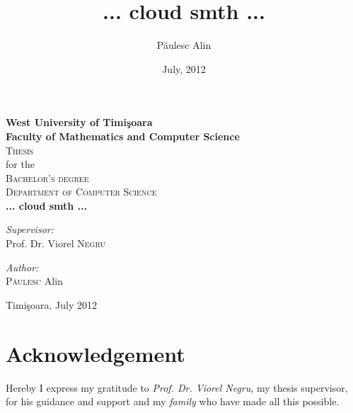 \documentclass[a4paper,12pt,titlepage]{scrreprt}
\begin{document}
\begin{titlepage}
\title{... cloud smth ...}
\author{P\u{a}ulesc Alin}
\date{July, 2012}

\begin{center}

    \textbf {\large West University of Timi\c{s}oara \\
	Faculty of Mathematics and Computer Science}\\[1.5cm]
    \textsc {\Large {Thesis}} \\[0.2cm]
    for the \\[0.2cm]
    \textsc {\Large {Bachelor's degree}}\\[0.2cm]
    \textsc {Department of Computer Science}\\[3cm]
    \textbf{\huge {... cloud smth ...}}\\[3cm]

    \begin{minipage}{0.4\textwidth}
        \begin{flushleft} \large
            \emph{Supervisor:}\\
	    Prof. Dr. Viorel \textsc{Negru}
        \end{flushleft}
    \end{minipage}
    \begin{minipage}{0.4\textwidth}
        \begin{flushright} \large
        \emph{Author:}\\
        \textsc{P\u{a}ulesc} Alin
        \end{flushright}
    \end{minipage}
    \null
    \vfill
    Timi\c{s}oara, July 2012
    \end{center}

\end{titlepage}


\setcounter{secnumdepth}{-1}
\chapter{Acknowledgement}
\begin{center}
Hereby I express my gratitude to \emph{Prof. Dr. Viorel Negru}, my thesis supervisor,\\[0.2cm]
for his guidance and support and my \emph{family} who have made all this possible.
\end{center}
\end{document}

